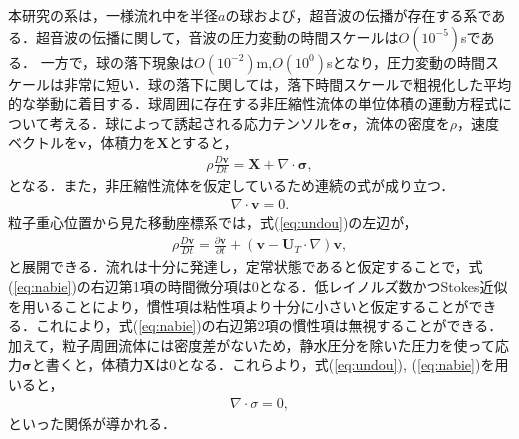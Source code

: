 本研究の系は，一様流れ中を半径$a$の球および，超音波の伝播が存在する系である．超音波の伝播に関して，音波の圧力変動の時間スケールは$O\left(10^{-5}\right)$sである．
一方で，球の落下現象は$O\left(10^{-2}\right)$m,$O\left(10^{0}\right)$sとなり，圧力変動の時間スケールは非常に短い．球の落下に関しては，落下時間スケールで粗視化した平均的な挙動に着目する．球周囲に存在する非圧縮性流体の単位体積の運動方程式について考える．球によって誘起される応力テンソルを$\bm{\sigma}$，流体の密度を$\rho$，速度ベクトルを$\bm{v}$，体積力を$\bm{X}$とすると，
\begin{eqnarray}
    \rho \frac{D\bm{v}}{Dt} = \bm{X} + \nabla \cdot \bm{\sigma} ,
    \label{eq:undou}
\end{eqnarray}
となる．また，非圧縮性流体を仮定しているため連続の式が成り立つ．
\begin{eqnarray}
    \nabla \cdot \bm{v} = 0 .
    \label{eq:renzoku}
\end{eqnarray}
粒子重心位置から見た移動座標系では，式(\ref{eq:undou})の左辺が，
\begin{eqnarray}
    \rho \frac{D\bm{v}}{Dt} = \frac{\partial \bm{v}}{\partial t} + \left(\bm{v} - \bm{U}_T \cdot \nabla \right) \bm{v} ,
    \label{eq:nabie}
\end{eqnarray}
と展開できる．流れは十分に発達し，定常状態であると仮定することで，式(\ref{eq:nabie})の右辺第1項の時間微分項は0となる．低レイノルズ数かつStokes近似を用いることにより，慣性項は粘性項より十分に小さいと仮定することができる．これにより，式(\ref{eq:nabie})の右辺第2項の慣性項は無視することができる．加えて，粒子周囲流体には密度差がないため，静水圧分を除いた圧力を使って応力${\bm \sigma}$と書くと，体積力${\bm X}$は0となる．これらより，式(\ref{eq:undou}), (\ref{eq:nabie})を用いると，
\begin{eqnarray}
    \nabla \cdot \sigma = 0 ,
    \label{eq:sigma-}
\end{eqnarray}
といった関係が導かれる．

